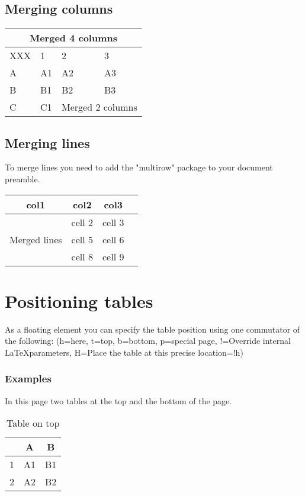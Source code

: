 \subsection{Merging columns}
\begin{tabular}{ |l|l|l|l|  }
	\hline
	\multicolumn{4}{|c|}{Merged 4 columns} \\
	\hline
	XXX & 1 & 2 & 3\\
	\hline
	A   & A1    &A2& A3\\ \hline
	B&   B1  & B2   &B3\\ \hline
	C &C1 & \multicolumn{2}{|c|}{Merged 2 columns}\\
	\hline
\end{tabular}

\subsection{Merging lines} 
To merge lines you need to add the "multirow" package to your document preamble.
\begin{center}
	\begin{tabular}{ |c|c|c|c| } 
		\hline
		col1 & col2 & col3 \\
		\hline
		\multirow{3}{4em}{Merged lines} & cell 2 & cell 3 \\ 
		& cell 5 & cell 6 \\ 
		& cell 8 & cell 9 \\ 
		\hline
	\end{tabular}
\end{center}

\section{Positioning tables}
As a floating element you can specify the table position using one commutator of the following: (h=here, t=top, b=bottom, p=special page, !=Override internal \LaTeX parameters, H=Place the table at this precise location=!h)
\newpage

\subsubsection{Examples}
In this page two tables at the top and the bottom of the page.
\begin{table}[t]
	\centering
	\begin{tabular}{ |c|c|c| } 
		\hline
		& A & B \\
		\hline \hline
		1 & A1 & B1 \\ 
		\hline
		2 & A2 & B2 \\ 
		\hline
	\end{tabular}
	\caption{Table on top }
	\label{tab:table0}
\end{table}

